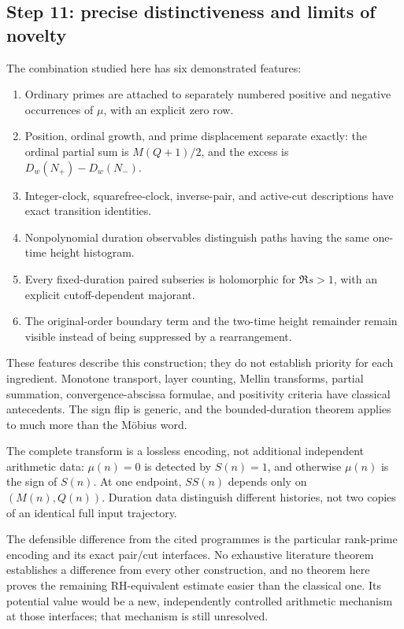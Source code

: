 \subsection{Step 11: precise distinctiveness and limits of novelty}
\label{subsec:a12-distinctiveness}
The combination studied here has six demonstrated features:
\begin{enumerate}[label=(\roman*),leftmargin=*]
\item Ordinary primes are attached to separately numbered positive and
negative occurrences of $\mu$, with an explicit zero row.
\item Position, ordinal growth, and prime displacement separate exactly:
the ordinal partial sum is $M(Q+1)/2$, and the excess is
$D_w(N_+)-D_w(N_-)$.
\item Integer-clock, squarefree-clock, inverse-pair, and active-cut
descriptions have exact transition identities.
\item Nonpolynomial duration observables distinguish paths having the
same one-time height histogram.
\item Every fixed-duration paired subseries is holomorphic for $\Re s>1$,
with an explicit cutoff-dependent majorant.
\item The original-order boundary term and the two-time height remainder
remain visible instead of being suppressed by a rearrangement.
\end{enumerate}

These features describe this construction; they do not establish priority
for each ingredient. Monotone transport, layer counting, Mellin transforms,
partial summation, convergence-abscissa formulae, and positivity criteria
have classical antecedents. The sign flip is generic, and the
bounded-duration theorem applies to much more than the M\"obius word.

The complete transform is a lossless encoding, not additional independent
arithmetic data: $\mu(n)=0$ is detected by $S(n)=1$, and otherwise $\mu(n)$
is the sign of $S(n)$. At one endpoint, $SS(n)$ depends only on $(M(n),Q(n))$.
Duration data distinguish different histories, not two copies of an
identical full input trajectory.

The defensible difference from the cited programmes is the particular
rank-prime encoding and its exact pair/cut interfaces.
No exhaustive literature theorem establishes a difference from every other
construction, and no theorem here proves the remaining RH-equivalent
estimate easier than the classical one. Its potential value would be a
new, independently controlled arithmetic mechanism at those interfaces;
that mechanism is still unresolved.

